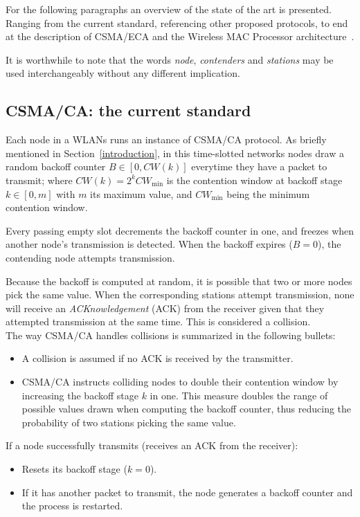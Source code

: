 For the following paragraphs an overview of the state of the art is presented. Ranging from the current standard, referencing other proposed protocols, to end at the description of CSMA/ECA and the Wireless MAC Processor architecture~\cite{WMP}.

It is worthwhile to note that the words \emph{node}, \emph{contenders} and \emph{stations} may be used interchangeably without any different implication.

\subsection{CSMA/CA: the current standard}
Each node in a WLANs runs an instance of CSMA/CA protocol. As briefly mentioned in Section~\ref{introduction}, in this time-slotted networks nodes draw a random backoff counter $B\in[0,CW(k)]$ everytime they have a packet to transmit; where $CW(k)=2^{k}CW_{\min}$ is the contention window at backoff stage $k\in[0,m]$ with $m$ its maximum value, and $CW_{\min}$ being the minimum contention window.

Every passing empty slot decrements the backoff counter in one, and freezes when another node's transmission is detected. When the backoff expires ($B=0$), the contending node attempts transmission.

Because the backoff is computed at random, it is possible that two or more nodes pick the same value. When the corresponding stations attempt transmission, none will receive an \emph{ACKnowledgement} (ACK) from the receiver given that they attempted transmission at the same time. This is considered a collision.\\

The way CSMA/CA handles collisions is summarized in the following bullets:
\begin{itemize}
	\item A collision is assumed if no ACK is received by the transmitter.
	\item CSMA/CA instructs colliding nodes to double their contention window by increasing the backoff stage $k$ in one. This measure doubles the range of possible values drawn when computing the backoff counter, thus reducing the probability of two stations picking the same value.
\end{itemize}

If a node successfully transmits (receives an ACK from the receiver):
\begin{itemize}
	\item Resets its backoff stage ($k=0$).
	\item If it has another packet to transmit, the node generates a backoff counter and the process is restarted.
\end{itemize}

